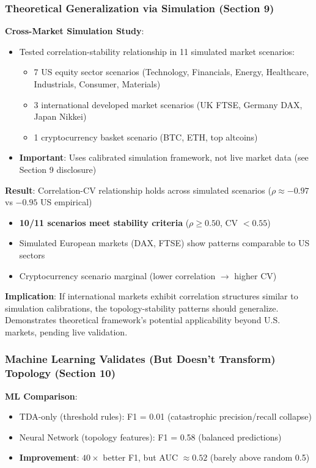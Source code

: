 \subsubsection{Theoretical Generalization via Simulation (Section 9)}

\textbf{Cross-Market Simulation Study}:
\begin{itemize}
\item Tested correlation-stability relationship in 11 simulated market scenarios:
  \begin{itemize}
  \item 7 US equity sector scenarios (Technology, Financials, Energy, Healthcare, Industrials, Consumer, Materials)
  \item 3 international developed market scenarios (UK FTSE, Germany DAX, Japan Nikkei)
  \item 1 cryptocurrency basket scenario (BTC, ETH, top altcoins)
  \end{itemize}
\item \textbf{Important}: Uses calibrated simulation framework, not live market data (see Section 9 disclosure)
\end{itemize}

\textbf{Result}: Correlation-CV relationship holds across simulated scenarios ($\rho \approx -0.97$ vs $-0.95$ US empirical)
\begin{itemize}
\item \textbf{10/11 scenarios meet stability criteria} ($\rho \geq 0.50$, CV $< 0.55$)
\item Simulated European markets (DAX, FTSE) show patterns comparable to US sectors
\item Cryptocurrency scenario marginal (lower correlation $\rightarrow$ higher CV)
\end{itemize}

\textbf{Implication}: If international markets exhibit correlation structures similar to simulation calibrations, the topology-stability patterns should generalize. Demonstrates theoretical framework's potential applicability beyond U.S. markets, pending live validation.

\subsubsection{Machine Learning Validates (But Doesn't Transform) Topology (Section 10)}

\textbf{ML Comparison}:
\begin{itemize}
\item TDA-only (threshold rules): F1 = 0.01 (catastrophic precision/recall collapse)
\item Neural Network (topology features): F1 = 0.58 (balanced predictions)
\item \textbf{Improvement}: $40\times$ better F1, but AUC $\approx 0.52$ (barely above random 0.5)
\end{itemize}

